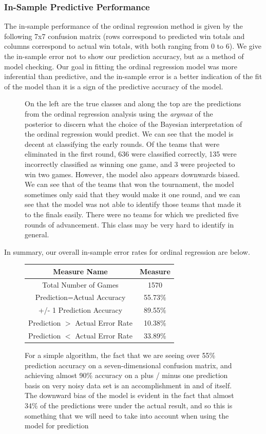 \documentclass[10pt,a4paper, hidelinks]{article} %
\begin{document}
\subsubsection{In-Sample Predictive Performance}
The in-sample performance of the ordinal regression method is given by the following 7x7 confusion matrix (rows correspond to predicted win totals and columns correspond to actual win totals, with both ranging from 0 to 6). We give the in-sample error not to show our prediction accuracy, but as a method of model checking. Our goal in fitting the ordinal regression model was more inferential than predictive, and the in-sample error is a better indication of the fit of the model than it is a sign of the predictive accuracy of the model. 
\begin{figure}[H]
	\centering
	
\caption{On the left are the true classes and along the top are the predictions from the ordinal regression analysis using the \textit{argmax} of the posterior to discern what the choice of the Bayesian interpretation of the ordinal regression would predict. We can see that the model is decent at classifying the early rounds. Of the teams that were eliminated in the first round, 636 were classified correctly, 135 were incorrectly classified as winning one game, and 3 were projected to win two games. However, the model also appears downwards biased. We can see that of the teams that won the tournament, the model sometimes only said that they would make it one round, and we can see that the model was not able to identify those teams that made it to the finals easily. There were no teams for which we predicted five rounds of advancement. This class may be very hard to identify in general.}
\end{figure}

In summary, our overall in-sample error rates for ordinal regression are below.
\begin{figure}[H]
	\centering 
	\begin{tabular}{cc}
		\toprule
		Measure Name & Measure\\ 
		\midrule
		Total Number of Games & 1570\\ 
		Prediction=Actual Accuracy & 55.73\%\\ 
		+/- 1 Prediction Accuracy & 89.55\%\\ 
		Prediction $>$ Actual Error Rate & 10.38\%\\ 
		Prediction $<$ Actual Error Rate & 33.89\%\\ 
		\bottomrule
	\end{tabular}
	\caption{For a simple algorithm, the fact that we are seeing over 55\% prediction accuracy on a seven-dimensional confusion matrix, and achieving almost 90\% accuracy on a plus / minus one prediction basis on very noisy data set is an accomplishment in and of itself. The downward bias of the model is evident in the fact that almost 34\% of the predictions were under the actual result, and so this is something that we will need to take into account when using the model for prediction}
\end{figure}
\end{document}
